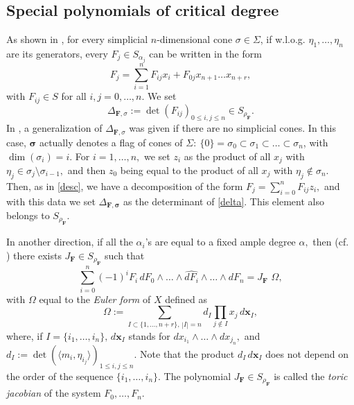 \documentclass[a4paper,11pt]{amsart}
\newcommand{\bfx}{{\boldsymbol{x}}}
\newcommand{\bfsigma}{{\boldsymbol{\sigma}}}
\newcommand{\bfF}{{\boldsymbol{F}}}
\numberwithin{thm}{section}
\numberwithin{equation}{section}
\theoremstyle{definition}
\theoremstyle{plain}
\begin{document}
\subsection{Special polynomials of critical degree}
As shown in \cite{CCD97}, for every simplicial  $n$-dimensional cone $\sigma\in \Sigma$, if w.l.o.g. $\eta_1,\ldots, \eta_n$ are its generators, every $F_j\in S_{\alpha_j}$ can be written in the form
\begin{equation}\label{desc}
F_j=\sum_{i=1}^n F_{ij}x_i+F_{0j}x_{n+1}\ldots x_{n+r},
\end{equation}
with $F_{ij}\in S$ for all $i,j=0,\ldots, n.$
We set
\begin{equation}\label{delta}
\Delta_{\bfF,\sigma}:=\det(F_{ij})_{0\leq i,j\leq n}\in S_{\rho_\bfF}.
\end{equation} 
 In \cite{DK05}, a generalization of  $\Delta_{\bfF,\sigma}$ was given if there are no simplicial cones.  In this case, $\bfsigma$ actually denotes a flag of cones of $\Sigma: \ \{0\}=\sigma_0\subset\sigma_1\subset\ldots\subset\sigma_n$, with $\dim(\sigma_i)=i.$ For $i=1,\ldots, n,$ we set $z_i$ as the product of all $x_j$ with $\eta_j\in \sigma_j\setminus\sigma_{i-1},$ and then $z_{0}$ being equal to the product of all $x_j$ with $\eta_j\notin\sigma_n.$ Then, as in \eqref{desc}, we have a decomposition of the form
 $F_j=\sum_{i=0}^{n} F_{ij}z_i,$ and with this data we set $\Delta_{\bfF,\bfsigma}$ as the determinant of \eqref{delta}. This element also belongs to $S_{\rho_\bfF}.$
 
 
 In another direction, if all the $\alpha_i$'s are equal to a fixed ample degree $\alpha,$ then (cf. \cite[Proposition 4.1]{cox95}) there exists $J_\bfF\in S_{\rho_\bfF}$ such that
\begin{equation}\label{eule}
\sum_{i=0}^n(-1)^i F_i\,dF_0\wedge\ldots\wedge\widehat{dF_i}\wedge\ldots\wedge dF_n= J_\bfF\,\, \Omega,
\end{equation}
with $\Omega$ equal to the {\em Euler form} of $X$ defined as
\begin{equation}\label{omega}
\Omega:=\sum_{I\subset\{1,\ldots, n+r\},\,|I|=n} d_I\prod_{j\notin I} x_j\,d\bfx_I,
\end{equation}
where, if $I=\{i_1,\ldots, i_n\},\, d\bfx_I$ stands for $dx_{i_1}\wedge\ldots\wedge dx_{j_n},$ and $d_I:=\det(\langle m_i,\eta_{i_j}\rangle)_{1\leq i,j\leq n}.$  Note that the product $d_I\,d\bfx_I$ does not depend on the order of the sequence $\{i_1, \dots, i_n\}$.
The polynomial $J_\bfF\in S_{\rho_\bfF}$ is called the {\em toric jacobian} of the system $F_0,\ldots, F_n$. 
\end{document}
